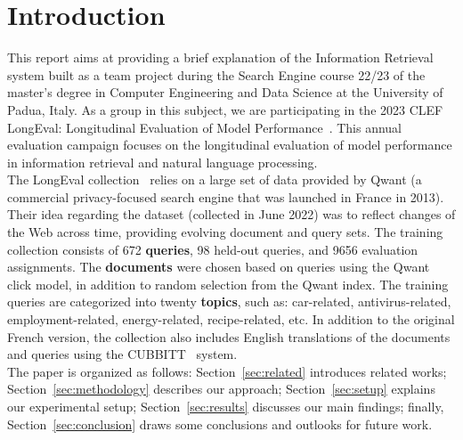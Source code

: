 \section{Introduction}
\label{sec:introduction}

This report aims at providing a brief explanation of the Information Retrieval system built as a team project during the
Search Engine course 22/23 of the master's degree in Computer Engineering and Data Science at the University of Padua,
Italy.
As a group in this subject, we are participating in the 2023 CLEF LongEval: Longitudinal Evaluation of Model
Performance~\cite{LongEval}.
This annual evaluation campaign focuses on the longitudinal evaluation of model performance in information retrieval and
natural language processing.\\

The LongEval collection~\cite{traindata} relies on a large set of data provided by Qwant (a commercial privacy-focused
search engine that was launched in France in 2013).
Their idea regarding the dataset (collected in June 2022) was to reflect changes of the Web across time, providing
evolving document and query sets.
The training collection consists of 672 \textbf{queries}, 98 held-out queries, and 9656 evaluation assignments.
The \textbf{documents} were chosen based on queries using the Qwant click model, in addition to random selection from
the Qwant index.
The training queries are categorized into twenty \textbf{topics}, such as: car-related, antivirus-related,
employment-related, energy-related, recipe-related, etc.
In addition to the original French version, the collection also includes English translations of the documents and
queries using the CUBBITT~\cite{CUBBITT} system.\\

The paper is organized as follows: Section~\ref{sec:related} introduces related works;
Section~\ref{sec:methodology} describes our approach;
Section~\ref{sec:setup} explains our experimental setup;
Section~\ref{sec:results} discusses our main findings;
finally, Section~\ref{sec:conclusion} draws some conclusions and outlooks for future work.